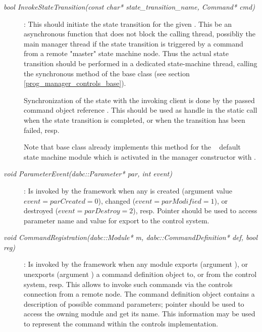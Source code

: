\begin{description}
\item[\em bool InvokeStateTransition(const char* state\_transition\_name, 
Command* cmd)] : 
This should initiate the state transition for the given .
This  be an asynchronous function that does not block the calling thread,
possibliy the main manager thread if the state transition is triggered by a command
from a remote "master" state machine node. Thus the actual state transition should be performed in a dedicated state-machine thread, calling the synchronous method
 of the base class (see section \ref{prog_manager_controls_base}).

Synchronization of the state with the invoking client is done by
the passed command object reference . 
This should be used as handle in the static call  when the state transition is completed, or  when the transition has been failed, resp.

Note that base class  already implements this method for the 
\dabc~ default state machine module which is activated in the
manager constructor with . 



\item[\em void ParameterEvent(dabc::Parameter* par, int event)] :
Is invoked by the framework when any  is created 
(argument value $event=parCreated=0$),  changed ($event=parModified=1$),
or destroyed ($event=parDestroy=2$), resp. Pointer  should be used to access parameter
name and value for export to the control system. 


\item[\em void CommandRegistration(dabc::Module* m, dabc::CommandDefinition* def, bool reg)] :
Is invoked by the framework when any module exports (argument  ), or
unexports (argument  ) a command definition object
to, or from the control system, resp. This allows to invoke such 
commands via the controls connection from a remote node. 
The command definition object 
contains a description of possible command parameters; 
pointer  should be used to access the owning module and
get its name. This information may be used to represent the command within
the controls implementation.





\end{description}
